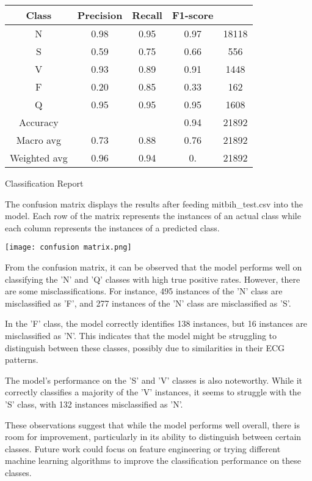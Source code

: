 \documentclass{article}
\begin{document}
\begin{multicols}{2}
\begin{tabular}{c|c c c c}
\hline
Class & Precision & Recall & F1-score \\ \hline
N & 0.98 & 0.95 & 0.97 & 18118 \\
S & 0.59 & 0.75 & 0.66 & 556 \\ 
V & 0.93 & 0.89 & 0.91 & 1448 \\ 
F & 0.20 & 0.85 & 0.33 & 162 \\ 
Q & 0.95 & 0.95 & 0.95 & 1608 \\ \hline
\multicolumn{1}{c|}{Accuracy} & & & 0.94 & 21892 \\
\multicolumn{1}{c|}{Macro avg} & 0.73 & 0.88 & 0.76 & 21892 \\
\multicolumn{1}{c|}{Weighted avg} & 0.96 & 0.94 & 0. & 21892\\ \hline
\end{tabular}
\caption{Classification Report}
\label{table:classification_report}


The confusion matrix displays the results after feeding mitbih\_test.csv into the model. Each row of the matrix represents the instances of an actual class while each column represents the instances of a predicted class.

 
\texttt{[image: confusion matrix.png]}
    \label{fig:confusion matrix}

From the confusion matrix, it can be observed that the model performs well on classifying the 'N' and 'Q' classes with high true positive rates. However, there are some misclassifications. For instance, 495 instances of the 'N' class are misclassified as 'F', and 277 instances of the 'N' class are misclassified as 'S'. 

In the 'F' class, the model correctly identifies 138 instances, but 16 instances are misclassified as 'N'. This indicates that the model might be struggling to distinguish between these classes, possibly due to similarities in their ECG patterns.

The model's performance on the 'S' and 'V' classes is also noteworthy. While it correctly classifies a majority of the 'V' instances, it seems to struggle with the 'S' class, with 132 instances misclassified as 'N'.

These observations suggest that while the model performs well overall, there is room for improvement, particularly in its ability to distinguish between certain classes. Future work could focus on feature engineering or trying different machine learning algorithms to improve the classification performance on these classes.


\end{multicols}
\end{document}
